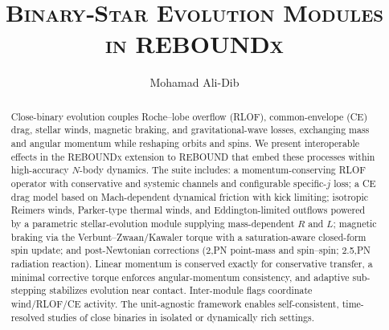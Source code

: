 \documentclass[11pt]{article}
\begin{document}
\title{\textsc{Binary‑Star Evolution Modules in
         \textnormal{REBOUNDx}}}
\author{Mohamad Ali-Dib}
\date{}
\maketitle
\vspace*{-1.5em}

\begin{abstract}
Close-binary evolution couples Roche–lobe overflow (RLOF), common-envelope (CE) drag, stellar winds, magnetic braking, and gravitational-wave losses, exchanging mass and angular momentum while reshaping orbits and spins. We present interoperable effects in the \textsc{REBOUNDx} extension to \textsc{REBOUND} that embed these processes within high-accuracy $N$-body dynamics. The suite includes: a momentum-conserving RLOF operator with conservative and systemic channels and configurable specific-$j$ loss; a CE drag model based on Mach-dependent dynamical friction with kick limiting; isotropic Reimers winds, Parker-type thermal winds, and Eddington-limited outflows powered by a parametric stellar-evolution module supplying mass-dependent $R$ and $L$; magnetic braking via the Verbunt–Zwaan/Kawaler torque with a saturation-aware closed-form spin update; and post-Newtonian corrections (2,PN point-mass and spin–spin; 2.5,PN radiation reaction). Linear momentum is conserved exactly for conservative transfer, a minimal corrective torque enforces angular-momentum consistency, and adaptive sub-stepping stabilizes evolution near contact. Inter-module flags coordinate wind/RLOF/CE activity. The unit-agnostic framework enables self-consistent, time-resolved studies of close binaries in isolated or dynamically rich settings.
\end{abstract}

\end{document}
